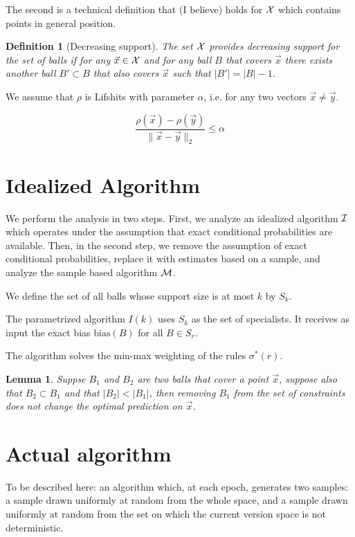 \documentclass{article}
\newtheorem{lemma}[theorem]{Lemma}
\newtheorem{definition}[theorem]{Definition}
\newcommand{\X}{{\cal X}}
\newcommand{\x}{\vec{x}}
\newcommand{\y}{\vec{y}}
\newcommand{\I}{{\cal I}}
\newcommand{\M}{{\cal M}}
\newcommand{\bias}{\text{bias}}
\begin{document}
The second is a technical definition that (I believe) holds for $\X$ which contains points in
general position.
\begin{definition}[Decreasing support]
The set $\X$ provides decreasing support for the set of balls if for
any $\x \in \X$ and for any ball $B$ that covers $\x$ there exists
another ball $B' \subset B$ that also covers $\x$ such that $|B'| = |B|-1$.
\end{definition}

We assume that $\rho$ is Lifshits
with parameter $\alpha$, i.e. for any two vectors $\vec{x}\neq\vec{y}$.

$$\frac{\rho(\x)-\rho(\y)}{\|\x-\y\|_2} \leq \alpha$$

\section{Idealized Algorithm}

We perform the analysis in two steps. First, we analyze an idealized
algorithm $\I$
which operates under the assumption that exact conditional
probabilities are available. Then, in the second step, we remove the
assumption of exact conditional probabilities, replace it with
estimates based on a sample, and analyze the sample based algorithm $\M$.

We define the set of all balls whose support size is at most $k$ by $S_k$.

The parametrized algorithm $I(k)$ uses $S_k$ as the set of
specialists.  It receives as input the exact bias $\bias(B)$ for all $B \in S_r$.

The algorithm solves the min-max weighting of the rules $\sigma^*(r)$.

\begin{lemma}
  Suppse $B_1$ and $B_2$ are two balls that cover a point $\x$,
  suppose also that $B_2 \subset B_1$ and that $|B_2| < |B_1|$, then
  removing $B_1$ from the set of constraints does not change the
  optimal prediction on $\x$.
\end{lemma}

\section{Actual algorithm}

To be described here: an algorithm which, at each epoch, generates two
samples: a sample drawn uniformly at random from the whole space, and
a sample drawn uniformly at random from the set on which the current
version space is not deterministic.
\end{document}
